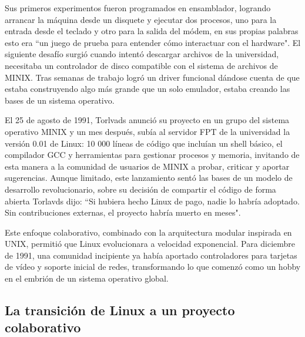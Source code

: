 \documentclass[a4paper,12pt]{article}
\begin{document}
Sus primeros experimentos fueron programados en ensamblador, logrando arrancar
la máquina desde un disquete y ejecutar dos procesos, uno para la entrada desde
el teclado y otro para la salida del módem, en sus propias palabras esto era ``un
juego de prueba para entender cómo interactuar con el hardware". El siguiente
desafío surgió cuando intentó descargar archivos de la universidad, necesitaba
un controlador de disco compatible con el sistema de archivos de MINIX. Tras
semanas de trabajo logró un driver funcional dándose cuenta de que estaba 
construyendo algo más grande que un solo emulador, estaba creando las bases de
un sistema operativo.

El 25 de agosto de 1991, Torlvads anunció su proyecto en un grupo del sistema
operativo MINIX y un mes después, subía al servidor FPT de la universidad la
versión 0.01 de Linux: 10 000 líneas de código que incluían un shell básico, el
compilador GCC y herramientas para gestionar procesos y memoria, invitando de
esta manera a la comunidad de usuarios de MINIX a probar, criticar y aportar
sugerencias. Aunque limitado, este lanzamiento sentó las bases de un modelo de
desarrollo revolucionario, sobre su decisión de compartir el código de forma
abierta Torlavds dijo: ``Si hubiera hecho Linux de pago, nadie lo habría
adoptado. Sin contribuciones externas, el proyecto habría muerto en meses".

Este enfoque colaborativo, combinado con la arquitectura modular inspirada en
UNIX, permitió que Linux evolucionara a velocidad exponencial. Para diciembre de
1991, una comunidad incipiente ya había aportado controladores para tarjetas de
vídeo y soporte inicial de redes, transformando lo que comenzó como un hobby en
el embrión de un sistema operativo global.

\subsection{La transición de Linux a un proyecto colaborativo}
\end{document}
